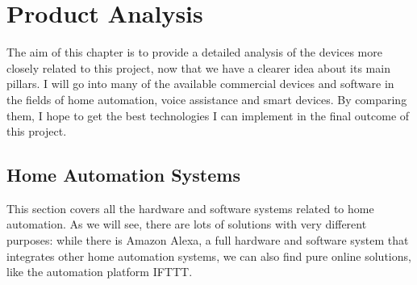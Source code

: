 \chapter{Product Analysis}

The aim of this chapter is to provide a detailed analysis of the devices more closely related to this project, now that we have a 
clearer idea about its main pillars. I will go into many of the available commercial devices and software in the fields of home 
automation, voice assistance and smart devices. By comparing them, I hope to get the best technologies I can implement in
the final outcome of this project.

\section{Home Automation Systems}
This section covers all the hardware and software systems related to home automation. As we will see, there are lots of solutions
with very different purposes: while there is Amazon Alexa, a full hardware and software system that integrates other home automation
systems, we can also find pure online solutions, like the automation platform IFTTT.


